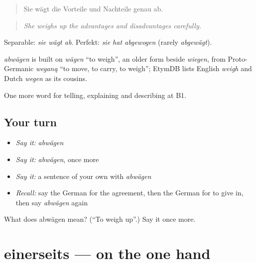 \begin{quote}
Sie wägt die Vorteile und Nachteile genau ab.
\end{quote}

\begin{quote}
\emph{She weighs up the advantages and disadvantages carefully.}
\end{quote}

Separable: \emph{sie wägt ab}. Perfekt: \emph{sie hat abgewogen} (rarely \emph{abgewägt}).

\begin{cousinweb}
\emph{abwägen} is built on \emph{wägen} \textquotedblleft{}to weigh\textquotedblright{}, an older form beside \emph{wiegen}, from Proto-Germanic \emph{weganą} \textquotedblleft{}to move, to carry, to weigh\textquotedblright{}; EtymDB lists English \emph{weigh} and Dutch \emph{wegen} as its cousins.
\end{cousinweb}

\begin{grammarlens}[title={What you've built}]
One more word for telling, explaining and describing at B1.
\end{grammarlens}

\subsection*{Your turn}
\begin{itemize}
\raggedright
  \item \emph{Say it:} \emph{abwägen}
  \item \emph{Say it:} \emph{abwägen}, once more
  \item \emph{Say it:} a sentence of your own with \emph{abwägen}
  \item \emph{Recall:} say the German for the agreement, then the German for to give in, then say \emph{abwägen} again
\end{itemize}

\begin{tcolorbox}[breakable,colback=teal!4,colframe=teal!35!black,title={Before you move on}]
What does abwägen mean? (\textquotedblleft{}To weigh up\textquotedblright{}.) Say it once more.
\end{tcolorbox}
\section[einerseits]{einerseits — on the one hand}

\label{lesson:GE-C336-einerseits}



